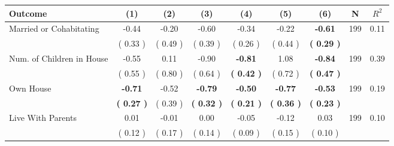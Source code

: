 \begin{tabular}{lcccccccc}
\toprule
 \textbf{Outcome} & \textbf{(1)} & \textbf{(2)} & \textbf{(3)} & \textbf{(4)} & \textbf{(5)} & \textbf{(6)} & \textbf{N} & \textbf{$ R^2$} \\
\midrule
Married or Cohabitating &     -0.44 &     -0.20 &     -0.60 &     -0.34 &     -0.22 & \textbf{    -0.61} & 199 &       0.11 \\ 
 & (     0.33 ) & (     0.49 ) & (     0.39 ) & (     0.26 ) & (     0.44 ) & \textbf{(     0.29 )} & \\
Num. of Children in House &     -0.55 &      0.11 &     -0.90 & \textbf{    -0.81} &      1.08 & \textbf{    -0.84} & 199 &       0.39 \\ 
 & (     0.55 ) & (     0.80 ) & (     0.64 ) & \textbf{(     0.42 )} & (     0.72 ) & \textbf{(     0.47 )} & \\
Own House & \textbf{    -0.71} &     -0.52 & \textbf{    -0.79} & \textbf{    -0.50} & \textbf{    -0.77} & \textbf{    -0.53} & 199 &       0.19 \\ 
 & \textbf{(     0.27 )} & (     0.39 ) & \textbf{(     0.32 )} & \textbf{(     0.21 )} & \textbf{(     0.36 )} & \textbf{(     0.23 )} & \\
Live With Parents &      0.01 &     -0.01 &      0.00 &     -0.05 &     -0.12 &      0.03 & 199 &       0.10 \\ 
 & (     0.12 ) & (     0.17 ) & (     0.14 ) & (     0.09 ) & (     0.15 ) & (     0.10 ) & \\
\bottomrule
\end{tabular}
